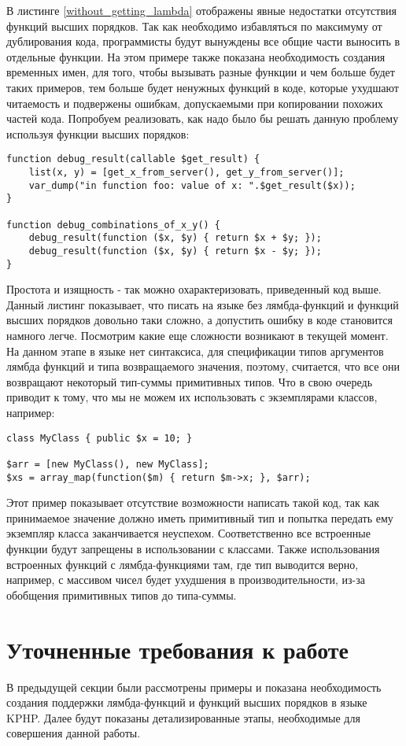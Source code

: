 В листинге \ref{without_getting_lambda} отображены явные недостатки отсутствия функций высших порядков.
Так как необходимо избавляться по максимуму от дублирования кода, программисты будут вынуждены все общие части выносить в отдельные функции.
На этом примере также показана необходимость создания временных имен, для того, чтобы вызывать разные функции и чем больше будет таких примеров, тем больше будет ненужных функций в коде, которые ухудшают читаемость и подвержены ошибкам, допускаемыми при копировании похожих частей кода.
Попробуем реализовать, как надо было бы решать данную проблему используя функции высших порядков:
\begin{lstlisting}
function debug_result(callable $get_result) {
	list(x, y) = [get_x_from_server(), get_y_from_server()];
	var_dump("in function foo: value of x: ".$get_result($x));
}

function debug_combinations_of_x_y() {
	debug_result(function ($x, $y) { return $x + $y; });
	debug_result(function ($x, $y) { return $x - $y; });
}
\end{lstlisting}

Простота и изящность - так можно охарактеризовать, приведенный код выше.
Данный листинг показывает, что писать на языке без лямбда-функций и функций высших порядков довольно таки сложно, а допустить ошибку в коде становится намного легче.
Посмотрим какие еще сложности возникают в текущей момент.
На данном этапе в языке нет синтаксиса, для спецификации типов аргументов лямбда функций и типа возвращаемого значения, поэтому, считается, что все они возвращают некоторый тип-суммы примитивных типов.
Что в свою очередь приводит к тому, что мы не можем их использовать с экземплярами классов, например:
\begin{lstlisting}
class MyClass { public $x = 10; }

$arr = [new MyClass(), new MyClass];
$xs = array_map(function($m) { return $m->x; }, $arr);
\end{lstlisting}

Этот пример показывает отсутствие возможности написать такой код, так как принимаемое значение должно иметь примитивный тип и попытка передать ему экземпляр класса заканчивается неуспехом.
Соответственно все встроенные функции будут запрещены в использовании с классами.
Также использования встроенных функций с лямбда-функциями там, где тип выводится верно, например, с массивом чисел будет ухудшения в производительности, из-за обобщения примитивных типов до типа-суммы.

\section{Уточненные требования к работе}
В предыдущей секции были рассмотрены примеры и показана необходимость создания поддержки лямбда-функций и функций высших порядков в языке KPHP. Далее будут показаны детализированные этапы, необходимые для совершения данной работы.

